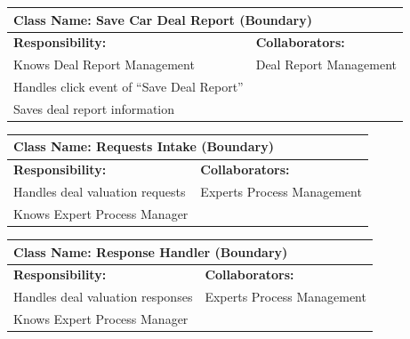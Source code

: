 \documentclass[]{article}
\begin{document}
\begin{table}[H]
  \centering
  \renewcommand{\arraystretch}{1.3} %
  \begin{tabular}{|p{7.5cm}|p{7.5cm}|}
    \hline
    \multicolumn{2}{|l|}{\textbf{Class Name: Save Car Deal Report (Boundary)}} \\
    \hline
    \textbf{Responsibility:}                  & \textbf{Collaborators:}        \\
    \hline
    Knows Deal Report Management              & Deal Report Management         \\
    Handles click event of “Save Deal Report” &                                \\
    Saves deal report information             &                                \\
    \hline
  \end{tabular}
\end{table}
\begin{table}[H]
  \centering
  \renewcommand{\arraystretch}{1.3} %
  \begin{tabular}{|p{7.5cm}|p{7.5cm}|}
    \hline
    \multicolumn{2}{|l|}{\textbf{Class Name: Requests Intake (Boundary)}} \\
    \hline
    \textbf{Responsibility:}        & \textbf{Collaborators:}             \\
    \hline
    Handles deal valuation requests & Experts Process Management          \\
    Knows Expert Process Manager    &                                     \\
    \hline
  \end{tabular}
\end{table}
\begin{table}[H]
  \centering
  \renewcommand{\arraystretch}{1.3} %
  \begin{tabular}{|p{7.5cm}|p{7.5cm}|}
    \hline
    \multicolumn{2}{|l|}{\textbf{Class Name: Response Handler (Boundary)}} \\
    \hline
    \textbf{Responsibility:}         & \textbf{Collaborators:}             \\
    \hline
    Handles deal valuation responses & Experts Process Management          \\
    Knows Expert Process Manager     &                                     \\
    \hline
  \end{tabular}
\end{table}
\end{document}

